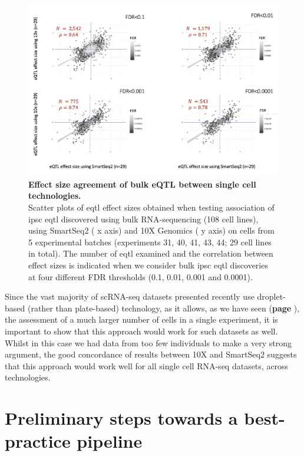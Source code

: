 \begin{figure}[h]
\centering
\includegraphics[width=15cm]{Chapter3/Fig/beta_comparison_ss2_vs_10x.png}
\caption[iPSC sc-eQTL replication across technologies]{\textbf{Effect size agreement of bulk eQTL between single cell technologies.}\\
Scatter plots of \gls{eqtl} effect sizes obtained when testing association of \gls{ipsc} \gls{eqtl} discovered using bulk RNA-sequencing (108 cell lines), using SmartSeq2 (\cite{picelli2013smart} x axis) and 10X Genomics (\cite{zheng2017massively} y axis) on cells from 5 experimental batches (experiments 31, 40, 41, 43, 44; 29 cell lines in total). 
The number of \gls{eqtl} examined and the correlation between effect sizes is indicated when we consider bulk \gls{ipsc} \gls{eqtl} discoveries at four different FDR thresholds (0.1, 0.01, 0.001 and 0.0001).}
\label{fig:sc_eqtl_technologies}
\end{figure}

Since the vast majority of scRNA-seq datasets presented recently use droplet-based (rather than plate-based) technology, as it allows, as we have seen (\textbf{page \pageref{fig:scrnaseq_plate_vs_droplet}}), the assessment of a much larger number of cells in a single experiment, it is important to show that this approach would work for such datasets as well. 
Whilst in this case we had data from too few individuals to make a very strong argument, the good concordance of results between 10X and SmartSeq2 suggests that this approach would work well for all single cell RNA-seq datasets, across technologies.

\clearpage

\section{Preliminary steps towards a best-practice pipeline}
\label{sec:best_practice}

